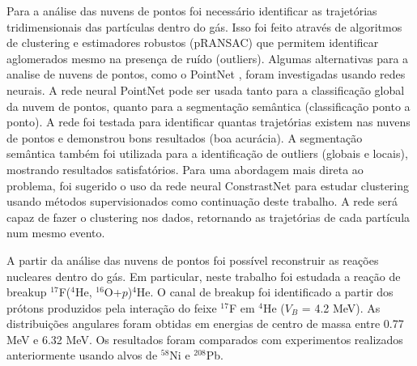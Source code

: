 \documentclass[a4paper,12pt,oneside]{book}
\begin{document}
\par Para a análise das nuvens de pontos foi necessário identificar as trajetórias tridimensionais das partículas dentro do gás. Isso foi feito através de algoritmos de clustering e estimadores robustos (pRANSAC) \cite{artigo} que permitem identificar aglomerados mesmo na presença de ruído (outliers). Algumas alternativas para a analise de nuvens de pontos, como o PointNet \cite{qi2016pointnet}, foram investigadas usando redes neurais. A rede neural PointNet pode ser usada tanto para a classificação global da nuvem de pontos, quanto para a segmentação semântica (classificação ponto a ponto). A rede foi testada para identificar quantas trajetórias existem nas nuvens de pontos e demonstrou bons resultados (boa acurácia). A segmentação semântica também foi utilizada para a identificação de outliers (globais e locais), mostrando resultados satisfatórios. Para uma abordagem mais direta ao problema, foi sugerido o uso da rede neural ConstrastNet \cite{contrastnet} para estudar clustering usando métodos supervisionados como continuação deste trabalho. A rede será capaz de fazer o clustering nos dados, retornando as trajetórias de cada partícula num mesmo evento.

\par A partir da análise das nuvens de pontos foi possível reconstruir as reações nucleares dentro do gás. Em particular, neste trabalho foi estudada a reação de breakup $^{17}$F($^{4}$He, $^{16}$O+$p$)$^{4}$He. O canal de breakup foi identificado a partir dos prótons produzidos pela interação do feixe $^{17}$F em $^{4}$He ($V_B$ = 4.2 MeV). As distribuições angulares foram obtidas em energias de centro de massa entre 0.77 MeV e 6.32 MeV. Os resultados foram comparados com experimentos realizados anteriormente  usando alvos de $^{58}$Ni e $^{208}$Pb. 

\end{document}
